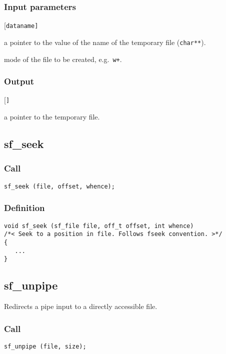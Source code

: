 \subsubsection*{Input parameters}
\begin{desclist}{\tt }{\quad}[\tt dataname]
   \setlength\itemsep{0pt}
   \item[dataname] a pointer to the value of the name of the temporary file (\texttt{char**}).
   \item[mode] mode of the file to be created, e.g.~\texttt{w+}.
 \end{desclist}

\subsubsection*{Output}
\begin{desclist}{\tt }{\quad}[\tt ]
   \setlength\itemsep{0pt}
   \item[tmp] a pointer to the temporary file.
\end{desclist}




\subsection{{sf\_seek}}

\subsubsection*{Call}
\begin{verbatim}sf_seek (file, offset, whence);\end{verbatim}

\subsubsection*{Definition}
\begin{verbatim}
void sf_seek (sf_file file, off_t offset, int whence)
/*< Seek to a position in file. Follows fseek convention. >*/
{
   ...
}
\end{verbatim}




\subsection{{sf\_unpipe}}
Redirects a pipe input to a directly accessible file.

\subsubsection*{Call}
\begin{verbatim}sf_unpipe (file, size);\end{verbatim}

